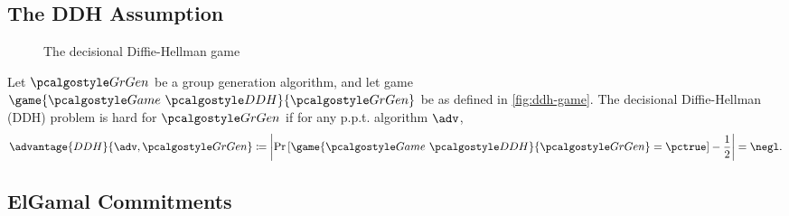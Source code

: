 \subsection{The DDH Assumption}

\begin{figure}[tbhp]
  \begin{center}
    \begin{tcolorbox}[width=6cm]
      \begin{pchstack}[center]
      \end{pchstack}
    \end{tcolorbox}
  \end{center}
  \caption{The decisional Diffie-Hellman game\label{fig:ddh-game}}
\end{figure}

\begin{definition}
  Let $\grgen$ be a group generation algorithm, and let game $\game{\Game~\algo{DDH}}{\grgen}$ be as defined in \autoref{fig:ddh-game}.
  The decisional Diffie-Hellman (DDH) problem is hard for $\grgen$ if for any p.p.t. algorithm $\adv$,
  \[
  \advantage{DDH}{\adv, \grgen} \defeq \left|\pr{\game{\Game~\algo{DDH}}{\grgen} = \pctrue} - \frac{1}{2}\right| = \negl.
  \]
\end{definition}

\subsection{ElGamal Commitments}

